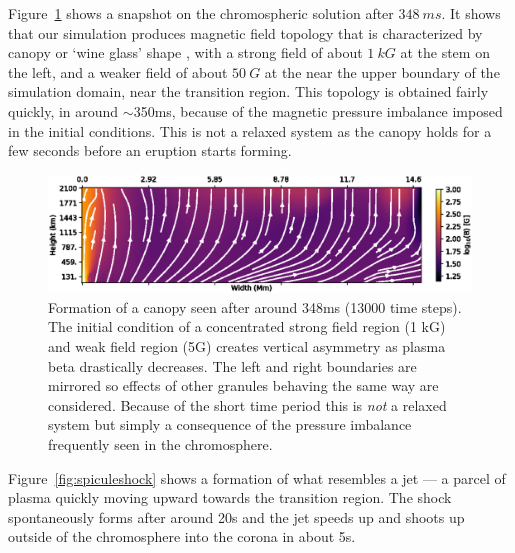 \documentclass[12pt,upcase]{umlthesis}
\begin{document}
Figure~\ref{fig:granulegeometry} shows a snapshot on the chromospheric solution after $348~ms$. It shows that our simulation produces magnetic field topology that is characterized by canopy or `wine glass' shape \citep{Rutten2007}, with a strong field of about $1~kG$ at the stem on the left, and a weaker field of about $50~G$ at the near the upper boundary of the simulation domain, near the transition region.  This topology is obtained fairly quickly, in around $\sim$350ms, because of the magnetic pressure imbalance imposed in the initial conditions. This is not a relaxed system as the canopy holds for a few seconds before an eruption starts forming. 

\begin{figure}[ht!]
	\centering
	\includegraphics[width=1\textwidth]{images/granulegeometry.eps}
	\caption{Formation of a canopy seen after around 348ms (13000 time steps). The initial condition of a concentrated strong field region (1 kG) and weak field region (5G) creates vertical asymmetry as plasma beta drastically decreases. The left and right boundaries are mirrored so effects of other granules behaving the same way are considered. Because of the short time period this is \textit{not} a relaxed system but simply a consequence of the pressure imbalance frequently seen in the chromosphere.}\label{fig:granulegeometry}
\end{figure}

Figure~\ref{fig:spiculeshock} shows a formation of what resembles a jet --- a parcel of plasma quickly moving upward towards the transition region. The shock spontaneously forms after around 20s and the jet speeds up and shoots up outside of the chromosphere into the corona in about 5s. 
\end{document}
